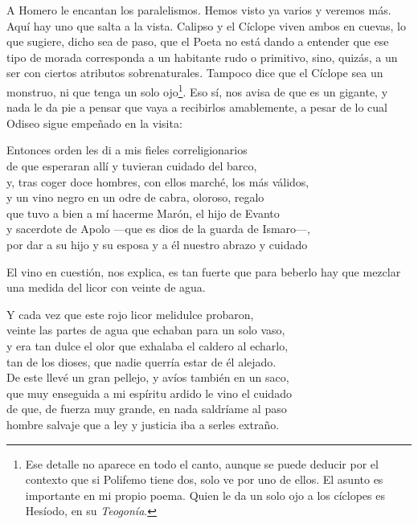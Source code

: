 A Homero le encantan los paralelismos. Hemos visto ya varios y veremos más. Aquí hay uno que salta a la vista. Calipso y el Cíclope viven ambos en cuevas, lo que sugiere, dicho sea de paso, que el Poeta no está dando a entender que ese tipo de morada corresponda a un habitante rudo o primitivo, sino, quizás, a un ser con ciertos atributos sobrenaturales. Tampoco dice que el Cíclope sea un monstruo, ni que tenga un solo ojo\footnote{Ese detalle no aparece en todo el canto, aunque se puede deducir por el contexto que si Polifemo tiene dos, solo ve por uno de ellos. El asunto es importante en mi propio poema. Quien le da un solo ojo a los cíclopes es Hesíodo, en su \emph{Teogonía}.}. Eso sí, nos avisa de que es un gigante, y nada le da pie a pensar que vaya a recibirlos amablemente, a pesar de lo cual Odiseo sigue empeñado en la visita:

\begin{versocita}
Entonces orden les di a mis fieles correligionarios\\
de que esperaran allí y tuvieran cuidado del barco,\\
y, tras coger doce hombres, con ellos marché, los más válidos,\\
y un vino negro en un odre de cabra, oloroso, regalo\\
que tuvo a bien a mí hacerme Marón, el hijo de Evanto\\
y sacerdote de Apolo ---que es dios de la guarda de Ismaro---,\\
por dar a su hijo y su esposa y a él nuestro abrazo y cuidado
\end{versocita}

El vino en cuestión, nos explica, es tan fuerte que para beberlo hay que mezclar una medida del licor con veinte de agua.

\begin{versocita}
Y cada vez que este rojo licor melidulce probaron,\\
veinte las partes de agua que echaban para un solo vaso,\\
y era tan dulce el olor que exhalaba el caldero al echarlo,\\
tan de los dioses, que nadie querría estar de él alejado.\\
De este llevé un gran pellejo, y avíos también en un saco,\\
que muy enseguida a mi espíritu ardido le vino el cuidado\\
de que, de fuerza muy grande, en nada saldríame al paso\\
hombre salvaje que a ley y justicia iba a serles extraño.
\end{versocita}

